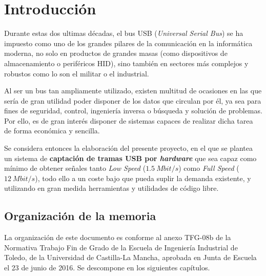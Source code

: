 \chapter{Introducción} 
\label{ch:introduccion}

Durante estas dos ultimas décadas, el bus USB\cite{specification2000revision} (\emph{Universal Serial Bus}) se ha impuesto como uno de los grandes pilares de la comunicación en la informática moderna, no solo en productos de grandes masas (como dispositivos de almacenamiento o periféricos HID\cite{usb:hid}), sino también en sectores más complejos y robustos como lo son el militar o el industrial.

Al ser un bus tan ampliamente utilizado, existen multitud de ocasiones en las que sería de gran utilidad poder disponer de los datos que circulan por él, ya sea para fines de seguridad\cite{NISSIM2017675}, control, ingeniería inversa o búsqueda y solución de problemas. Por ello, es de gran interés disponer de sistemas capaces de realizar dicha tarea de forma económica y sencilla.

Se considera entonces la elaboración del presente proyecto, en el que se plantea un sistema de \textbf{captación de tramas USB por \textit{hardware}} que sea capaz como mínimo de obtener señales tanto \textit{Low Speed} ($1.5~Mbit/s$) como \textit{Full Speed} ($12~Mbit/s$), todo ello a un coste bajo que pueda suplir la demanda existente, y utilizando en gran medida herramientas y utilidades de código libre.

\section{Organización de la memoria} 
La organización de este documento es conforme al anexo TFG-08b\cite{tfg08b} de la Normativa Trabajo Fin de Grado de la Escuela de Ingeniería Industrial de Toledo, de la Universidad de Castilla-La Mancha, aprobada en Junta de Escuela el 23 de junio de 2016. Se descompone en los siguientes capítulos.

